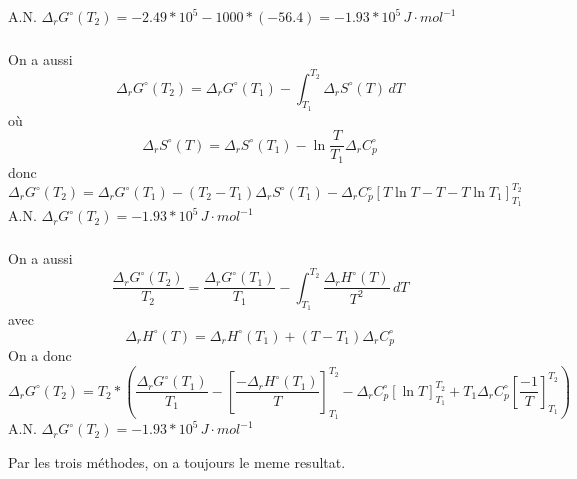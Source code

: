 \documentclass[a4paper,12pt]{book}
\begin{document}
\hspace*{\fill} 

A.N. $\boxed{\Delta_rG^\circ(T_2)=-2.49*10^5-1000*(-56.4)=-1.93*10^5 \,J\cdot mol^{-1}}$
\subsubsection{}
On a aussi 
$$
\Delta_rG^\circ(T_2)=\Delta_rG^\circ(T_1)-\int^{T_2}_{T_1}\Delta_rS^\circ(T)\,dT
$$
où
$$
\Delta_rS^\circ(T)=\Delta_rS^\circ(T_1)-\ln\frac{T}{T_1}\Delta_rC^\circ_p
$$
donc
$$
\Delta_rG^\circ(T_2)=\Delta_rG^\circ(T_1)-({T_2}-{T_1})\Delta_rS^\circ(T_1)-\Delta_rC^\circ_p\left[T \ln T-T-T\ln T_1\right]^{T_2}_{T_1}
$$
A.N. $\boxed{\Delta_rG^\circ(T_2)=-1.93*10^5\,J\cdot mol^{-1}}$

\subsubsection{}
On a aussi
$$
\frac{\Delta_rG^\circ(T_2)}{T_2}=\frac{\Delta_rG^\circ(T_1)}{T_1}-\int^{T_2}_{T_1}\frac{\Delta_rH^\circ(T)}{T^2}\,dT
$$
avec
$$
\Delta_rH^\circ(T)=\Delta_rH^\circ(T_1)+(T-T_1)\Delta_rC_p^\circ
$$
On a donc 
$$
\Delta_rG^\circ(T_2)=T_2*\left(\frac{\Delta_rG^\circ(T_1)}{T_1}-\left[\frac{-\Delta_rH^\circ(T_1)}{T}\right]^{T_2}_{T_1}-\Delta_rC_p^\circ
\left[\ln T\right]^{T_2}_{T_1}+T_1\Delta_rC_p^\circ\left[\frac{-1}{T}\right]^{T_2}_{T_1}\right)
$$
A.N. $\boxed{\Delta_rG^\circ(T_2)=-1.93*10^5\,J\cdot mol^{-1}}$

\hspace*{\fill} 

Par les trois méthodes, on a toujours le meme resultat.
\end{document}
